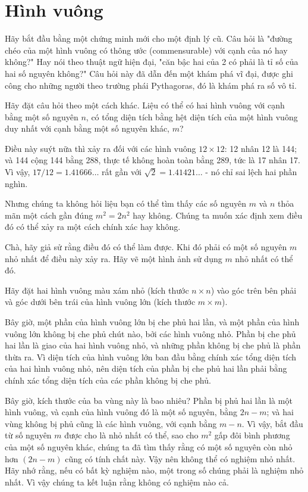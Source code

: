 \documentclass[12pt,a4paper]{article}
\begin{document}
\section*{Hình vuông}
Hãy bắt đầu bằng một chứng minh mới cho một định lý cũ. Câu hỏi là "đường chéo của một hình vuông có thông ước (commensurable) với cạnh của nó hay không?" Hay nói theo thuật ngữ hiện đại, "căn bậc hai của 2 có phải là tỉ số của hai số nguyên không?" Câu hỏi này đã dẫn đến một khám phá vĩ đại, được ghi công cho những người theo trường phái Pythagoras, đó là khám phá ra số vô tỉ.

Hãy đặt câu hỏi theo một cách khác. Liệu có thể có hai hình vuông với cạnh bằng một số nguyên $n$, có tổng diện tích bằng hệt diện tích của một hình vuông duy nhất với cạnh bằng một số nguyên khác, $m$?

Điều này suýt nữa thì xảy ra đối với các hình vuông $12 \times 12$: 12 nhân 12 là 144; và 144 cộng 144 bằng 288, thực tế không hoàn toàn bằng 289, tức là 17 nhân 17. Vì vậy, $17/12 = 1.41666 \dots$ rất gần với $\sqrt{2} = 1.41421 \dots$ - nó chỉ sai lệch hai phần nghìn.

Nhưng chúng ta không hỏi liệu bạn có thể tìm thấy các số nguyên $m$ và $n$ thỏa mãn một cách gần đúng $m^2 = 2n^2$ hay không. Chúng ta muốn xác định xem điều đó có thể xảy ra một cách chính xác hay không.

Chà, hãy giả sử rằng điều đó có thể làm được. Khi đó phải có một số nguyên $m$ nhỏ nhất để điều này xảy ra. Hãy vẽ một hình ảnh sử dụng $m$ nhỏ nhất có thể đó.

Hãy đặt hai hình vuông màu xám nhỏ (kích thước $n \times n$) vào góc trên bên phải và góc dưới bên trái của hình vuông lớn (kích thước $m \times m$).

Bây giờ, một phần của hình vuông lớn bị che phủ hai lần, và một phần của hình vuông lớn không bị che phủ chút nào, bởi các hình vuông nhỏ. Phần bị che phủ hai lần là giao của hai hình vuông nhỏ, và những phần không bị che phủ là phần thừa ra. Vì diện tích của hình vuông lớn ban đầu bằng chính xác tổng diện tích của hai hình vuông nhỏ, nên diện tích của phần bị che phủ hai lần phải bằng chính xác tổng diện tích của các phần không bị che phủ.

Bây giờ, kích thước của ba vùng này là bao nhiêu? Phần bị phủ hai lần là một hình vuông, và cạnh của hình vuông đó là một số nguyên, bằng $2n - m$; và hai vùng không bị phủ cũng là các hình vuông, với cạnh bằng $m - n$. Vì vậy, bắt đầu từ số nguyên $m$ được cho là nhỏ nhất có thể, sao cho $m^2$ gấp đôi bình phương của một số nguyên khác, chúng ta đã tìm thấy rằng có một số nguyên còn nhỏ hơn $(2n - m)$ cũng có tính chất này. Vậy nên không thể có nghiệm nhỏ nhất. Hãy nhớ rằng, nếu có bất kỳ nghiệm nào, một trong số chúng phải là nghiệm nhỏ nhất. Vì vậy chúng ta kết luận rằng không có nghiệm nào cả.
\end{document}
